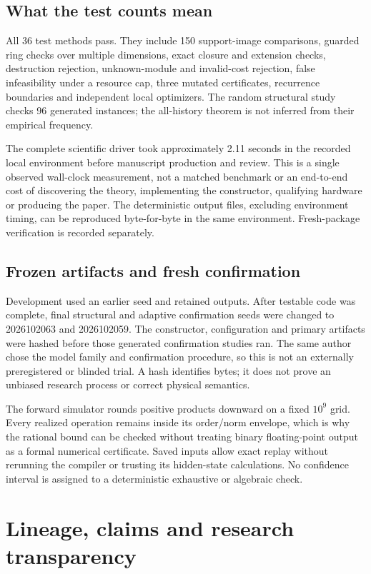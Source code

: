\documentclass[11pt,letterpaper]{article}
\theoremstyle{definition}\newtheorem{definition}[theorem]{Definition}
\theoremstyle{remark}\newtheorem{remark}[theorem]{Remark}
\begin{document}
\subsection{What the test counts mean}
All 36 test methods pass. They include 150 support-image comparisons, guarded ring checks over multiple dimensions, exact closure and extension checks, destruction rejection, unknown-module and invalid-cost rejection, false infeasibility under a resource cap, three mutated certificates, recurrence boundaries and independent local optimizers. The random structural study checks 96 generated instances; the all-history theorem is not inferred from their empirical frequency.

The complete scientific driver took approximately 2.11 seconds in the recorded local environment before manuscript production and review. This is a single observed wall-clock measurement, not a matched benchmark or an end-to-end cost of discovering the theory, implementing the constructor, qualifying hardware or producing the paper. The deterministic output files, excluding environment timing, can be reproduced byte-for-byte in the same environment. Fresh-package verification is recorded separately.

\subsection{Frozen artifacts and fresh confirmation}
Development used an earlier seed and retained outputs. After testable code was complete, final structural and adaptive confirmation seeds were changed to 2026102063 and 2026102059. The constructor, configuration and primary artifacts were hashed before those generated confirmation studies ran. The same author chose the model family and confirmation procedure, so this is not an externally preregistered or blinded trial. A hash identifies bytes; it does not prove an unbiased research process or correct physical semantics.

The forward simulator rounds positive products downward on a fixed $10^9$ grid. Every realized operation remains inside its order/norm envelope, which is why the rational bound can be checked without treating binary floating-point output as a formal numerical certificate. Saved inputs allow exact replay without rerunning the compiler or trusting its hidden-state calculations. No confidence interval is assigned to a deterministic exhaustive or algebraic check.

\section{Lineage, claims and research transparency}
\label{app:claims}
\end{document}
